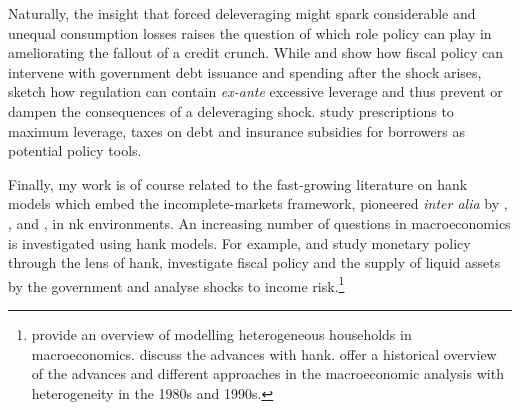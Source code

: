 \documentclass[12pt]{article} %
\numberwithin{equation}{section} %
\numberwithin{figure}{section}
\numberwithin{table}{section}
\begin{document}
Naturally, the insight that forced deleveraging might spark considerable and unequal consumption losses raises the question of which role policy can play in ameliorating the fallout of a credit crunch. While \textcite{egg2012} and \textcite{gl2017} show how fiscal policy can intervene with government debt issuance and spending after the shock arises, \textcite{korinek2016} sketch how regulation can contain \textit{ex-ante} excessive leverage and thus prevent or dampen the consequences of a deleveraging shock. \textcite{korinek2016} study prescriptions to maximum leverage, taxes on debt and insurance subsidies for borrowers as potential policy tools.

Finally, my work is of course related to the fast-growing literature on \Gls{hank} models which embed the incomplete-markets framework, pioneered \textit{inter alia} by \textcite{bewley1986}, \textcite{im1989}, \textcite{huggett1993} and \textcite{aiyagari1994}, in \Gls{nk} environments. An increasing number of questions in macroeconomics is investigated using \Gls{hank} models. For example, \textcite{mckay2016} and \textcite{kaplan2018} study monetary policy through the lens of \Gls{hank}, \textcite{bayer2023} investigate fiscal policy and the supply of liquid assets by the government and \textcite{bayer2019} analyse shocks to income risk.\footnote{\textcite{heath2009} provide an overview of modelling heterogeneous households in macroeconomics. \textcite{kv2018} discuss the advances with \Gls{hank}. \textcite{cherrier2023} offer a historical overview of the advances and different approaches in the macroeconomic analysis with heterogeneity in the 1980s and 1990s.}


\end{document}
